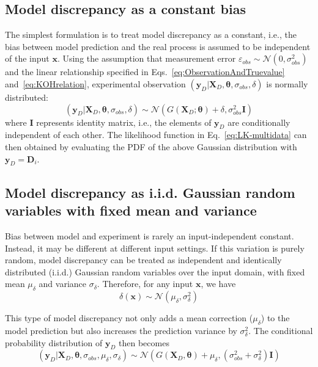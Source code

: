 \documentclass[preprint,review,12pt,3p]{elsarticle}
\begin{document}
\subsection{Model discrepancy as a constant bias}
The simplest formulation is to treat model discrepancy as a constant, i.e., the bias between model prediction and the real process is assumed to be independent of the input $\boldsymbol{x}$. Using the assumption that measurement error $\varepsilon_{obs} \sim \mathcal{N}(0, \sigma^2_{obs})$ and the linear relationship specified in Eqs.~\ref{eq:ObservationAndTruevalue} and~\ref{eq:KOHrelation}, experimental observation $(\boldsymbol{y}_D|\boldsymbol{X}_D, \boldsymbol{\theta},\sigma_{obs},\delta)$ is normally distributed:
\begin{equation}
(\boldsymbol{y}_D | \boldsymbol{X}_D, \boldsymbol{\theta},\sigma_{obs},\delta) \sim \mathcal{N}(G(\boldsymbol{X}_D; \boldsymbol{\theta})+\delta,\sigma_{obs}^2 \boldsymbol{I})
\end{equation}
where $\boldsymbol{I}$ represents identity matrix, i.e., the elements of $\boldsymbol{y}_D$ are conditionally independent of each other. The likelihood function in Eq.~\ref{eq:LK-multidata} can then obtained by evaluating the PDF of the above Gaussian distribution with $\boldsymbol{y}_D=\boldsymbol{D}_i$.

\subsection{Model discrepancy as i.i.d. Gaussian random variables with fixed mean and variance}\label{section:delta-iid-GaussRV}
Bias between model and experiment is rarely an input-independent constant. Instead, it may be different at different input settings. If this variation is purely random, model discrepancy can be treated as independent and identically distributed (i.i.d.) Gaussian random variables over the input domain, with fixed mean $\mu_{\delta}$ and variance $\sigma_{\delta}$. Therefore, for any input $\boldsymbol{x}$, we have 
\begin{equation}
\delta(\boldsymbol{x}) \sim \mathcal{N} (\mu_{\delta}, \sigma_{\delta}^2)
\end{equation}

This type of model discrepancy not only adds a mean correction ($\mu_{\delta}$) to the model prediction but also increases the prediction variance by $\sigma_{\delta}^2$. The conditional probability distribution of $\boldsymbol{y}_D$ then becomes
\begin{equation}
(\boldsymbol{y}_D | \boldsymbol{X}_D, \boldsymbol{\theta},\sigma_{obs},\mu_{\delta}, \sigma_{\delta}) \sim \mathcal{N}(G(\boldsymbol{X}_D, \boldsymbol{\theta})+\mu_{\delta},(\sigma_{obs}^2+\sigma_{\delta}^2)\boldsymbol{I})
\end{equation}
\end{document}
